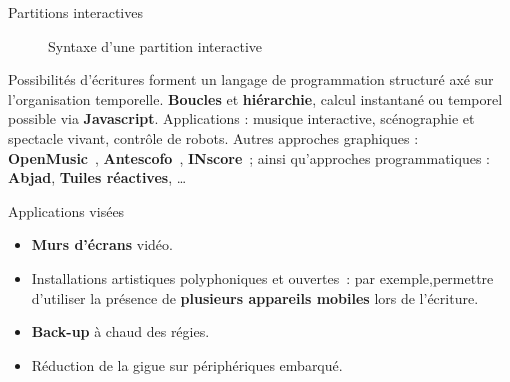 \begin{block}{Partitions interactives}
\begin{figure}
\caption{Syntaxe d'une partition interactive}
\end{figure}
Possibilités d'écritures forment un langage de programmation structuré axé sur l'organisation temporelle. 
\textbf{Boucles} et \textbf{hiérarchie}, calcul instantané ou temporel possible via \textbf{Javascript}.
Applications : musique interactive, scénographie et spectacle vivant, contrôle de robots.
Autres approches graphiques : \textbf{OpenMusic}~\cite{bresson_openmusic:_2011}, \textbf{Antescofo}~\cite{cont2008antescofo}, \textbf{INscore}~\cite{fober2012environment}; ainsi qu'approches programmatiques : \textbf{Abjad}, \textbf{Tuiles réactives}, \dots
\end{block}
\begin{block}{Applications visées}
    \begin{itemize}
        \item \textbf{Murs d'écrans} vidéo.
        \item Installations artistiques polyphoniques et ouvertes~: 
        par exemple,permettre d'utiliser la présence de \textbf{plusieurs appareils mobiles} 
        lors de l'écriture.
        \item \textbf{Back-up} à chaud des régies.
        \item Réduction de la gigue sur périphériques embarqué.
    \end{itemize}
\end{block}
